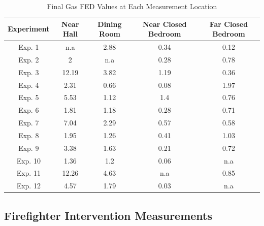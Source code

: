 \documentclass[12pt,oneside]{article}
\begin{document}
\begin{table}[!ht]
    \centering
    \caption{Final Gas FED Values at Each Measurement Location}
    \label{tab:final_fed}
    \begin{tabular}{ccccc}
    \toprule[1.5pt]
	\textbf{Experiment}  &   \textbf{Near Hall}& \textbf{Dining Room}& \textbf{Near Closed Bedroom}& \textbf{Far Closed Bedroom} \\ 
	  \midrule                                                                   
	Exp. 1 &       n.a&     2.88&         0.34&        0.12 \\  
	Exp. 2 &         2&      n.a&         0.28&        0.78 \\
	Exp. 3 &     12.19&     3.82&         1.19&        0.36 \\               
	Exp. 4 &      2.31&     0.66&         0.08&        1.97 \\                
	Exp. 5 &      5.53&     1.12&          1.4&        0.76 \\                 
	Exp. 6 &      1.81&     1.18&         0.28&        0.71 \\                 
	Exp. 7 &      7.04&     2.29&         0.57&        0.58 \\                
	Exp. 8 &      1.95&     1.26&         0.41&        1.03 \\            
	Exp. 9 &      3.38&     1.63&         0.21&        0.72 \\              
	Exp. 10&      1.36&      1.2&         0.06&         n.a \\         
	Exp. 11&     12.26&     4.63&          n.a&        0.85 \\             
	Exp. 12&      4.57&     1.79&         0.03&         n.a \\           
	 \bottomrule[1.25pt] 

    \end{tabular}
\end{table}


\subsection{Firefighter Intervention Measurements}
\label{subsec:ff_int}
\end{document}
